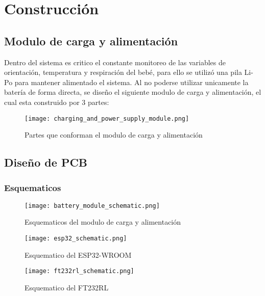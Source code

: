 \section{Construcción}

    \subsection{Modulo de carga y alimentación}

    Dentro del sistema es critico el constante monitoreo de las variables de orientación, 
    temperatura y respiración del bebé, para ello se utilizó una pila Li-Po para mantener 
    alimentado el sistema. Al no poderse utilizar unicamente la batería de forma directa, se
    diseño el siguiente modulo de carga y alimentación, el cual esta construido por 3 partes:

    \begin{figure}[htp!]
        \centering
        \texttt{[image: charging\_and\_power\_supply\_module.png]}
        \caption{Partes que conforman el modulo de carga y alimentación}
        \label{fig: charging_and_power_module}
    \end{figure}
    \FloatBarrier

    \subsection{Diseño de PCB}

    \subsubsection{Esquematicos}   

        \begin{figure}[htp!]
            \centering
            \texttt{[image: battery\_module\_schematic.png]}
            \caption{Esquematicos del modulo de carga y alimentación}
            \label{fig: battery_module_schematic}
        \end{figure}
        \FloatBarrier

        \begin{figure}[htp!]
            \centering
            \texttt{[image: esp32\_schematic.png]}
            \caption{Esquematico del ESP32-WROOM}
            \label{fig: esp32_schematic}
        \end{figure}
        \FloatBarrier

        \begin{figure}[htp!]
            \centering
            \texttt{[image: ft232rl\_schematic.png]}
            \caption{Esquematico del FT232RL}
            \label{fig: ft232rl_schematic}
        \end{figure}
        \FloatBarrier

